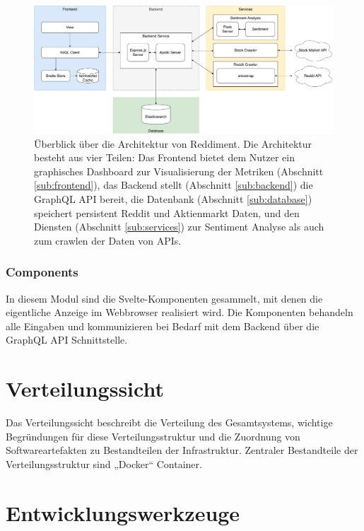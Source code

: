 \documentclass[a4paper, 10pt, conference]{IEEEtran}
\begin{document}
\begin{figure}[ht]
	\centering
	\includegraphics[width=\linewidth]{architecture}
	\caption{Überblick über die Architektur von Reddiment. Die Architektur besteht aus vier Teilen: Das Frontend bietet dem Nutzer ein graphisches Dashboard zur Visualisierung der Metriken (Abschnitt \ref{sub:frontend}),  das Backend stellt (Abschnitt \ref{sub:backend}) die GraphQL API bereit,  die Datenbank (Abschnitt \ref{sub:database}) speichert persistent Reddit und Aktienmarkt Daten,  und den Diensten (Abschnitt \ref{sub:services}) zur Sentiment Analyse als auch zum crawlen der Daten von APIs.}
	\label{fig:architecture}
\end{figure}

\subsubsection{Components}

In diesem Modul sind die Svelte-Komponenten gesammelt, mit denen die eigentliche Anzeige im Webbrowser realisiert wird.
Die Komponenten behandeln alle Eingaben und kommunizieren bei Bedarf mit dem Backend über die GraphQL API Schnittstelle.



\section{Verteilungssicht} \label{s:verteilungssicht}
Das Verteilungssicht beschreibt die Verteilung des Gesamtsystems,  wichtige Begründungen für diese Verteilungsstruktur und die Zuordnung von Softwareartefakten zu Bestandteilen der Infrastruktur.
Zentraler Bestandteile der Verteilungsstruktur sind „Docker“ \cite{docker} Container.


\section{Entwicklungswerkzeuge} \label{s:entwicklungswerkzeuge}
\end{document}
